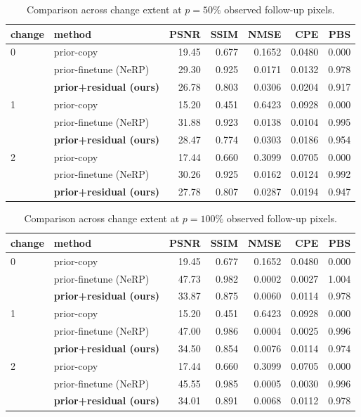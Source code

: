 \documentclass[11pt]{article}
\begin{document}
\begin{table}[H]\centering
\caption{Comparison across change extent at $p=50\%$ observed follow-up pixels.}
\begin{tabular}{llrrrrr}\toprule
change & method & PSNR & SSIM & NMSE & CPE & PBS \\ \midrule
0 & prior-copy & 19.45 & 0.677 & 0.1652 & 0.0480 & 0.000 \\
 & prior-finetune (NeRP) & 29.30 & 0.925 & 0.0171 & 0.0132 & 0.978 \\
 & \textbf{prior+residual (ours)} & 26.78 & 0.803 & 0.0306 & 0.0204 & 0.917 \\
\midrule
1 & prior-copy & 15.20 & 0.451 & 0.6423 & 0.0928 & 0.000 \\
 & prior-finetune (NeRP) & 31.88 & 0.923 & 0.0138 & 0.0104 & 0.995 \\
 & \textbf{prior+residual (ours)} & 28.47 & 0.774 & 0.0303 & 0.0186 & 0.954 \\
\midrule
2 & prior-copy & 17.44 & 0.660 & 0.3099 & 0.0705 & 0.000 \\
 & prior-finetune (NeRP) & 30.26 & 0.925 & 0.0162 & 0.0124 & 0.992 \\
 & \textbf{prior+residual (ours)} & 27.78 & 0.807 & 0.0287 & 0.0194 & 0.947 \\

\bottomrule\end{tabular}\end{table}
\begin{table}[H]\centering
\caption{Comparison across change extent at $p=100\%$ observed follow-up pixels.}
\begin{tabular}{llrrrrr}\toprule
change & method & PSNR & SSIM & NMSE & CPE & PBS \\ \midrule
0 & prior-copy & 19.45 & 0.677 & 0.1652 & 0.0480 & 0.000 \\
 & prior-finetune (NeRP) & 47.73 & 0.982 & 0.0002 & 0.0027 & 1.004 \\
 & \textbf{prior+residual (ours)} & 33.87 & 0.875 & 0.0060 & 0.0114 & 0.978 \\
\midrule
1 & prior-copy & 15.20 & 0.451 & 0.6423 & 0.0928 & 0.000 \\
 & prior-finetune (NeRP) & 47.00 & 0.986 & 0.0004 & 0.0025 & 0.996 \\
 & \textbf{prior+residual (ours)} & 34.50 & 0.854 & 0.0076 & 0.0114 & 0.974 \\
\midrule
2 & prior-copy & 17.44 & 0.660 & 0.3099 & 0.0705 & 0.000 \\
 & prior-finetune (NeRP) & 45.55 & 0.985 & 0.0005 & 0.0030 & 0.996 \\
 & \textbf{prior+residual (ours)} & 34.01 & 0.891 & 0.0068 & 0.0112 & 0.978 \\

\bottomrule\end{tabular}\end{table}
\end{document}
